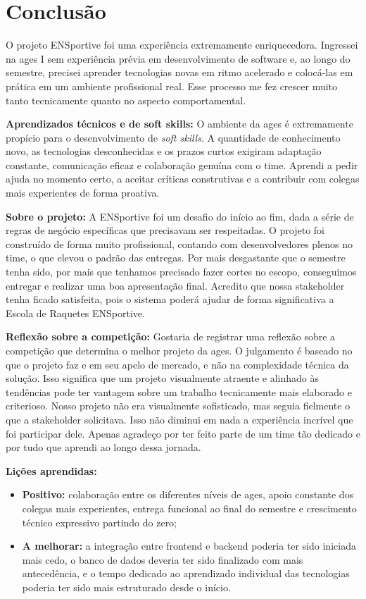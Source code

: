 \section[Conclusão]{Conclusão}

O projeto ENSportive foi uma experiência extremamente enriquecedora. Ingressei na
\ac{ages} I sem experiência prévia em desenvolvimento de software e, ao longo do
semestre, precisei aprender tecnologias novas em ritmo acelerado e colocá-las em
prática em um ambiente profissional real. Esse processo me fez crescer muito tanto
tecnicamente quanto no aspecto comportamental.

\textbf{Aprendizados técnicos e de soft skills:}
O ambiente da \ac{ages} é extremamente propício para o desenvolvimento de
\textit{soft skills}. A quantidade de conhecimento novo, as tecnologias desconhecidas
e os prazos curtos exigiram adaptação constante, comunicação eficaz e colaboração
genuína com o time. Aprendi a pedir ajuda no momento certo, a aceitar críticas
construtivas e a contribuir com colegas mais experientes de forma proativa.

\textbf{Sobre o projeto:}
A ENSportive foi um desafio do início ao fim, dada a série de regras de negócio
específicas que precisavam ser respeitadas. O projeto foi construído de forma muito
profissional, contando com desenvolvedores plenos no time, o que elevou o padrão
das entregas. Por mais desgastante que o semestre tenha sido, por mais que tenhamos
precisado fazer cortes no escopo, conseguimos entregar e realizar uma boa
apresentação final. Acredito que nossa stakeholder tenha ficado satisfeita, pois o
sistema poderá ajudar de forma significativa a Escola de Raquetes ENSportive.

\textbf{Reflexão sobre a competição:}
Gostaria de registrar uma reflexão sobre a competição que determina o melhor projeto
da \ac{ages}. O julgamento é baseado no que o projeto faz e em seu apelo de mercado,
e não na complexidade técnica da solução. Isso significa que um projeto visualmente
atraente e alinhado às tendências pode ter vantagem sobre um trabalho tecnicamente
mais elaborado e criterioso. Nosso projeto não era visualmente sofisticado, mas
seguia fielmente o que a stakeholder solicitava. Isso não diminui em nada a
experiência incrível que foi participar dele. Apenas agradeço por ter feito parte de
um time tão dedicado e por tudo que aprendi ao longo dessa jornada.

\textbf{Lições aprendidas:}
\begin{itemize}
  \item \textbf{Positivo:} colaboração entre os diferentes níveis de \ac{ages}, apoio
    constante dos colegas mais experientes, entrega funcional ao final do semestre
    e crescimento técnico expressivo partindo do zero;
  \item \textbf{A melhorar:} a integração entre frontend e backend poderia ter sido
    iniciada mais cedo, o banco de dados deveria ter sido finalizado com mais
    antecedência, e o tempo dedicado ao aprendizado individual das tecnologias
    poderia ter sido mais estruturado desde o início.
\end{itemize}
